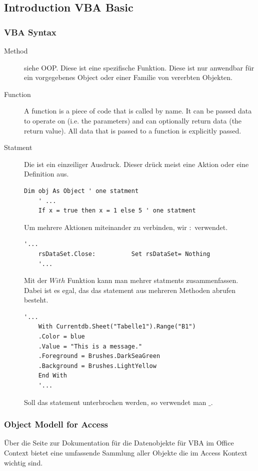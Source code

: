 \subsection{Introduction VBA Basic}
\subsubsection{VBA Syntax}
\begin{description}
	\item[Method] siehe \gls{OOP}. Diese ist eine spezifische Funktion. Diese ist nur anwendbar für ein vorgegebenes Object oder einer Familie von vererbten Objekten. 
	\item[Function] A function is a piece of code that is called by name. It can be passed data to operate on (i.e. the parameters) and can optionally return data (the return value). All data that is passed to a function is explicitly passed.
	\item[Statment] Die ist ein einzeiliger Ausdruck. Dieser drück meist eine Aktion oder eine Definition aus.
	\begin{lstlisting}[style=VBA]
	Dim obj As Object ' one statment
	' ...
	If x = true then x = 1 else 5 ' one statment
	\end{lstlisting}
	Um mehrere Aktionen miteinander zu verbinden, wir $:$ verwendet.
	\begin{lstlisting}[style=VBA]
	'...
	rsDataSet.Close:          Set rsDataSet= Nothing
	'...
	\end{lstlisting}
	Mit der $With$ Funktion kann man mehrer statments zusammenfassen. Dabei ist es egal, das das statement aus mehreren Methoden abrufen besteht. 
	\begin{lstlisting}[style=VBA]
	'...
	With Currentdb.Sheet("Tabelle1").Range("B1")
	.Color = blue
	.Value = "This is a message."
	.Foreground = Brushes.DarkSeaGreen
	.Background = Brushes.LightYellow
	End With
	'...
	\end{lstlisting}
	Soll das statement unterbrochen werden, so verwendet man $\_$.
\end{description} 

\subsubsection{Object Modell for Access}  
Über die Seite zur Dokumentation für die Datenobjekte für \gls{VBA} im Office Context bietet eine umfassende Sammlung aller Objekte die im Access Kontext wichtig sind. 

